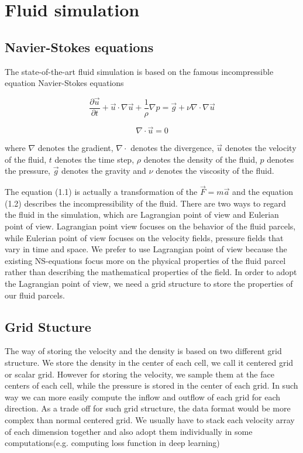 \documentclass[a4paper,12pt,twoside]{report}
\begin{document}
\section{Fluid simulation}
\subsection{Navier-Stokes equations}
The state-of-the-art fluid simulation is based on the famous incompressible equation Navier-Stokes equations

\begin{equation}
\frac{\partial \vec u}{\partial t}+\vec u\cdot \nabla\vec u+\frac1\rho\nabla p = \vec g + \nu\nabla\cdot\nabla\vec{u}
\end{equation}

\begin{equation}
{\nabla}\cdot\vec{u} = 0
\end{equation}

where $\nabla$ denotes the gradient, $\nabla\cdot$ denotes the divergence, $\vec{u}$ denotes the velocity of the fluid, $t$ denotes the time step, $\rho$ denotes the density of the fluid, $p$ denotes the pressure, $\vec{g}$ denotes the gravity and $\nu$ denotes the viscosity of the fluid.

The equation (1.1) is actually a transformation of the $\vec{F} = m\vec{a}$\cite{fluidnotes} and the equation (1.2) describes the incompressibility of the fluid. There are two ways to regard the fluid in the simulation, which are Lagrangian point of view and Eulerian point of  view. Lagrangian point view focuses on the behavior of the fluid parcels, while Eulerian point of view focuses on the velocity fields, pressure fields that vary in time and space. We prefer to use Lagrangian point of view because the existing NS-equations focus more on the physical properties of the fluid parcel rather than describing the mathematical properties of the field.  In order to adopt the Lagrangian point of view, we need a grid structure to store the properties of our fluid parcels.

\subsection{Grid Stucture}
The way of storing the velocity and the density is based on two different grid structure. We store the density in the center of each cell, we call it centered grid or scalar grid. However for storing the velocity, we sample them at the face centers of each cell\cite{doi:10.1063/1.1761178}, while the pressure is stored in the center of each grid. In such way we can more easily compute the inflow and outflow of each grid for each direction. As a trade off for such grid structure, the data format would be more complex than normal centered grid. We usually have to stack each velocity array of each dimension together and also adopt them individually in some computations(e.g. computing loss function in deep learning)
\end{document}
